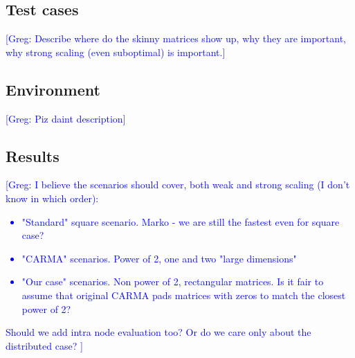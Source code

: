 \documentclass[sigplan,review,anonymous]{acmart}\settopmatter{printfolios=true,printccs=false,printacmref=false}
\newcommand\greg[1]{\textcolor{blue}{[Greg: #1]}}
\begin{document}
\subsection{Test cases}
\greg{Describe where do the skinny matrices show up, why they are important, 
why strong scaling (even suboptimal) is important.}
\subsection{Environment}
\greg{Piz daint description}
\subsection{Results}
\greg{I believe the scenarios should cover, both weak and strong scaling (I 
don't know in which order):
\begin{itemize}
	\item "Standard" square scenario. Marko - we are still the fastest even for 
	square case?
	\item "CARMA" scenarios. Power of 2, one and two "large dimensions"
	\item "Our case" scenarios. Non power of 2, rectangular matrices. Is it 
	fair to assume that original CARMA pads matrices with zeros to match the 
	closest power of 2?
\end{itemize}
Should we add intra node evaluation too? Or do we care only about the 
distributed case?
}


\end{document}
